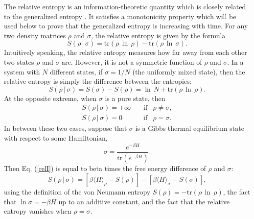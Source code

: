 \documentclass[12pt]{article}
\begin{document}
The relative entropy is an information-theoretic quantity which is closely related to the generalized entropy \cite{casini08}.  It satisfies a monotonicity property which will be used below to prove that the generalized entropy is increasing with time.  For any two density matrices $\rho$ and $\sigma$, the relative entropy is given by the formula
\begin{equation}\label{relI}
S(\rho\,|\,\sigma) = \mathrm{tr}(\rho\,\ln\,\rho) - \mathrm{tr}(\rho\,\ln\,\sigma).
\end{equation}
Intuitively speaking, the relative entropy measures how far away from each other two states $\rho$ and $\sigma$ are.  However, it is not a symmetric function of $\rho$ and $\sigma$.  In a system with $N$ different states, if $\sigma = 1/N$ (the uniformly mixed state), then the relative entropy is simply the difference between the entropies:
\begin{equation}
S(\rho\,|\,\sigma) = S(\sigma) - S(\rho) = \ln\,N + \mathrm{tr}(\rho\,\ln\,\rho).
\end{equation}
At the opposite extreme, when $\sigma$ is a pure state, then
\begin{eqnarray}
S(\rho\,|\,\sigma) = +\infty & \quad \mathrm{if} & \rho \ne \sigma, \\
S(\rho\,|\,\sigma) = 0 & \quad \mathrm{if} & \rho = \sigma.
\end{eqnarray}
In between these two cases, suppose that $\sigma$ is a Gibbs thermal equilibrium state with respect to some Hamiltonian,
\begin{equation}\label{Gibbs}
\sigma = \frac{e^{-\beta H}}{\mathrm{tr}(e^{-\beta H})}.
\end{equation}
Then Eq. (\ref{relI}) is equal to beta times the free energy difference of $\rho$ and $\sigma$:
\begin{equation}\label{Hafe}
S(\rho\,|\,\sigma) = 
[\beta\langle H \rangle_\rho -  S(\rho)] - [\beta\langle H \rangle_\sigma - S(\sigma)],
\end{equation}
using the definition of the von Neumann entropy $S(\rho) = -\mathrm{tr}(\rho\,\ln\,\rho)$, the fact that $\ln \sigma = -\beta H$ up to an additive constant, and the fact that the relative entropy vanishes when $\rho = \sigma$.
\end{document}
